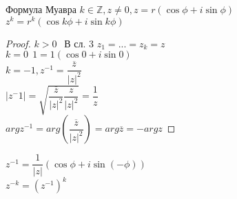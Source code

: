 \begin{consequence} Формула Муавра
	$ k \in \mathbb{Z}, z \neq 0 , z = r(\cos \phi + i \sin \phi) $ \\
	$  z^k = r^k (\cos k\phi + i \sin k\phi)$ 
	\begin{proof}
		$ k > 0 \  \ $ В сл. 3 $ z_1 = ... = z_k = z $ \\
		$ k = 0 \ \  1 = 1(\cos 0 + i \sin 0) $ \\
		$ k = -1 , z^{-1} = \dfrac{\overline{z}}{|z|^2} $ \\
		$ |z^-1| = \sqrt{ \dfrac{\overline{z}}{|z|^2}  \dfrac{z}{|z|^2}}  = \dfrac{1}{z} $ \\
		$ arg z^{-1} = arg(  \dfrac{\overline{z}}{|z|^2} ) = arg \overline{z} = - arg z $
	\end{proof}
	$ z^{-1} = \dfrac{1}{|z|} (\cos\phi + i \sin (-\phi)) $ \\
	$ z^{-k} = (z^{-1})^k $
\end{consequence}

